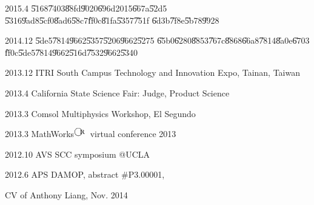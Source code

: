 \documentclass{sebase}
\begin{document}
\textsf{2015.4 \U{5168}\U{7403}\U{88fd}\U{9020}\U{696d}2015\U{667a}\U{52d5}%
\U{5316}\U{9ad8}\U{5cf0}\U{8ad6}\U{58c7}\U{ff0c}\U{81fa}\U{5357}\U{751f}%
\U{6d3b}\U{7f8e}\U{5b78}\U{9928}}

\textsf{2014.12 \U{5de5}\U{7814}\U{9662}\U{5357}\U{5206}\U{9662}\U{5275}%
\U{65b0}\U{6280}\U{8853}\U{767c}\U{8868}\U{66a8}\U{7814}\U{8a0e}\U{6703}%
\U{ff0c}\U{5de5}\U{7814}\U{9662}\U{516d}\U{7532}\U{9662}\U{5340}}

\textsf{2013.12 ITRI South Campus Technology and Innovation Expo, Tainan,
Taiwan}

\textsf{2013.4 California State Science Fair: Judge, Product Science}

\textsf{2013.3 Comsol Multiphysics Workshop, El Segundo}

\textsf{2013.3 MathWorks}$\registered $\textsf{\ virtual conference 2013}

\textsf{2012.10 AVS SCC symposium @UCLA}

\textsf{2012.6 APS DAMOP, abstract \#P3.00001, \href{https://sites.google.com/site/vitalyslab/home/damop2012%
}{\underline{\color{blue}}}}


\hspace{5.25in}CV of Anthony Liang, Nov. 2014
\end{document}
